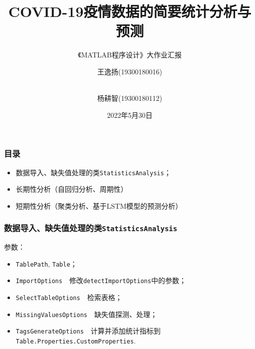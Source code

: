 \documentclass{beamer}
\title[COVID_19 Analysis]{\textbf{COVID-19疫情数据的简要统计分析与预测}}
\subtitle{《MATLAB程序设计》大作业汇报}
\author[王逸扬,杨耕智]{王逸扬(19300180016)\and \\ 杨耕智(19300180112)}
\date{2022年5月30日}
\begin{document}
\frame{\titlepage}
\begin{frame}
\frametitle{目录}
    \begin{itemize}
        \item 数据导入、缺失值处理的类\texttt{StatisticsAnalysis}；
        \item 长期性分析（自回归分析、周期性）
        \item 短期性分析（聚类分析、基于LSTM模型的预测分析）
    \end{itemize}
\end{frame}
\begin{frame}
\frametitle{数据导入、缺失值处理的类\texttt{StatisticsAnalysis}}
    参数：
    \begin{itemize}
        \item \texttt{\color{blue}TablePath}, \texttt{\color{blue}Table}；
        \item \texttt{\color{blue}ImportOptions}　修改\texttt{detectImportOptions}中的参数；
        \item \texttt{\color{blue}SelectTableOptions}　检索表格；
        \item \texttt{\color{blue}MissingValuesOptions}　缺失值探测、处理；
        \item \texttt{\color{blue}TagsGenerateOptions}　计算并添加统计指标到\texttt{Table.Properties.CustomProperties}.
    \end{itemize}
\end{frame}
\end{document}
